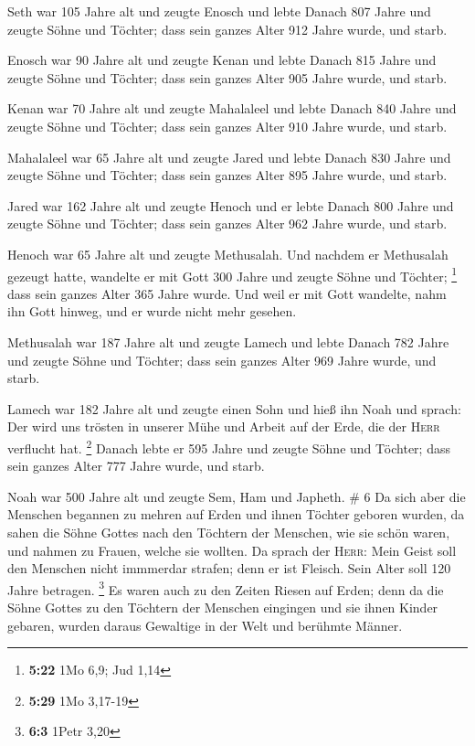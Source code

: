  Seth war 105 Jahre alt und zeugte Enosch 
und lebte Danach 807 Jahre und zeugte Söhne und Töchter; 
dass sein ganzes Alter 912 Jahre wurde, und starb.

 Enosch war 90 Jahre alt und zeugte Kenan 
und lebte Danach 815 Jahre und zeugte Söhne und Töchter; 
dass sein ganzes Alter 905 Jahre wurde, und starb.

 Kenan war 70 Jahre alt und zeugte Mahalaleel
 und lebte Danach 840 Jahre und zeugte Söhne und Töchter;
 dass sein ganzes Alter 910 Jahre wurde, und starb.

 Mahalaleel war 65 Jahre alt und zeugte Jared
 und lebte Danach 830 Jahre und zeugte Söhne und Töchter;
 dass sein ganzes Alter 895 Jahre wurde, und starb.

 Jared war 162 Jahre alt und zeugte Henoch
 und er lebte Danach 800 Jahre und zeugte Söhne und
Töchter;  dass sein ganzes Alter 962 Jahre wurde, und
starb.

 Henoch war 65 Jahre alt und zeugte Methusalah.
 Und nachdem er Methusalah gezeugt hatte, wandelte er mit
Gott 300 Jahre und zeugte Söhne und Töchter; \footnote{\textbf{5:22} 1Mo
  6,9; Jud 1,14}  dass sein ganzes Alter 365 Jahre wurde.
 Und weil er mit Gott wandelte, nahm ihn Gott hinweg, und
er wurde nicht mehr gesehen.

 Methusalah war 187 Jahre alt und zeugte Lamech
 und lebte Danach 782 Jahre und zeugte Söhne und Töchter;
 dass sein ganzes Alter 969 Jahre wurde, und starb.

 Lamech war 182 Jahre alt und zeugte einen Sohn
 und hieß ihn Noah und sprach: Der wird uns trösten in
unserer Mühe und Arbeit auf der Erde, die der \textsc{Herr} verflucht
hat. \footnote{\textbf{5:29} 1Mo 3,17-19}  Danach lebte
er 595 Jahre und zeugte Söhne und Töchter;  dass sein
ganzes Alter 777 Jahre wurde, und starb.

 Noah war 500 Jahre alt und zeugte Sem, Ham und Japheth.
\# 6  Da sich aber die Menschen begannen zu mehren auf
Erden und ihnen Töchter geboren wurden,  da sahen die
Söhne Gottes nach den Töchtern der Menschen, wie sie schön waren, und
nahmen zu Frauen, welche sie wollten.  Da sprach der
\textsc{Herr}: Mein Geist soll den Menschen nicht immmerdar strafen;
denn er ist Fleisch. Sein Alter soll 120 Jahre betragen. \footnote{\textbf{6:3}
  1Petr 3,20}  Es waren auch zu den Zeiten Riesen auf
Erden; denn da die Söhne Gottes zu den Töchtern der Menschen eingingen
und sie ihnen Kinder gebaren, wurden daraus Gewaltige in der Welt und
berühmte Männer.

